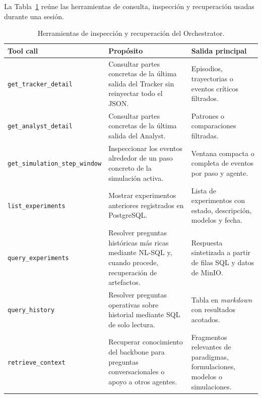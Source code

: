 La Tabla~\ref{tab:toolcalls-orchestrator-inspeccion} reúne las herramientas de
consulta, inspección y recuperación usadas durante una sesión.

\begin{table}[H]
\begin{center}
{\scriptsize
\setlength{\tabcolsep}{6pt}
\renewcommand{\arraystretch}{1.12}
\begin{tabular}{|>{\raggedright\arraybackslash}p{3.2cm}|>{\raggedright\arraybackslash}p{5.2cm}|>{\raggedright\arraybackslash}p{4.1cm}|} \hline
\textbf{Tool call} & \textbf{Propósito} & \textbf{Salida principal} \\ \hline
\texttt{get\_tracker\_detail} & Consultar partes concretas de la última salida del Tracker sin reinyectar todo el JSON. & Episodios, trayectorias o eventos críticos filtrados. \\ \hline
\texttt{get\_analyst\_detail} & Consultar partes concretas de la última salida del Analyst. & Patrones o comparaciones filtradas. \\ \hline
\texttt{get\_\allowbreak simulation\_\allowbreak step\_\allowbreak window} & Inspeccionar los eventos alrededor de un paso concreto de la simulación activa. & Ventana compacta o completa de eventos por paso y agente. \\ \hline
\texttt{list\_experiments} & Mostrar experimentos anteriores registrados en PostgreSQL. & Lista de experimentos con estado, descripción, modelos y fecha. \\ \hline
\texttt{query\_experiments} & Resolver preguntas históricas más ricas mediante NL-SQL y, cuando procede, recuperación de artefactos. & Respuesta sintetizada a partir de filas SQL y datos de MinIO. \\ \hline
\texttt{query\_history} & Resolver preguntas operativas sobre historial mediante SQL de solo lectura. & Tabla en \textit{markdown} con resultados acotados. \\ \hline
\texttt{retrieve\_context} & Recuperar conocimiento del backbone para preguntas conversacionales o apoyo a otros agentes. & Fragmentos relevantes de paradigmas, formulaciones, modelos o simulaciones. \\ \hline
\end{tabular}
}
\caption[Herramientas de inspección del Orchestrator]{Herramientas de
inspección y recuperación del Orchestrator.}
\label{tab:toolcalls-orchestrator-inspeccion}
\end{center}
\end{table}

